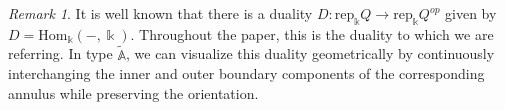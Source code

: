 \documentclass[12pt]{amsart}
\theoremstyle{plain}
\theoremstyle{definition}
\theoremstyle{remark}
\newtheorem{rem}{Remark}[section]
\begin{document}
{\color{black} 

\begin{rem}\label{rem: Duality on Annulus}
    It is well known that there is a duality $D: \text{rep}_{\Bbbk}Q \rightarrow \text{rep}_{\Bbbk}Q^{op}$ given by $D = \text{Hom}_{\Bbbk}(-,\Bbbk)$. Throughout the paper, this is the duality to which we are referring. In type $\tilde{\mathbb{A}}$, we can visualize this duality geometrically by continuously interchanging the inner and outer boundary components of the corresponding annulus while preserving the orientation.
\end{rem}

}

\end{document}
